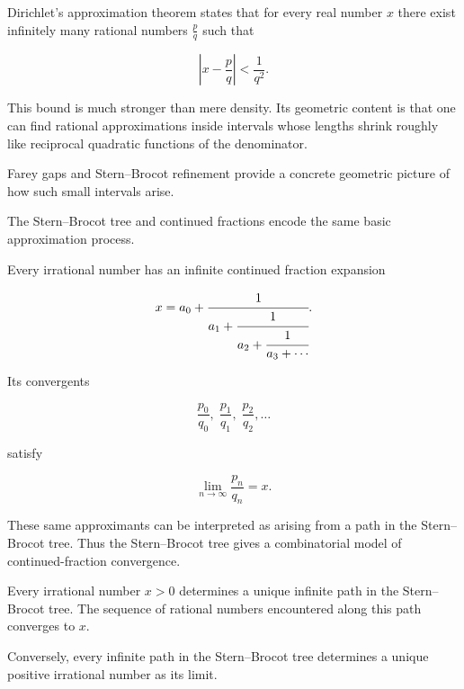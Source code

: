 
\begin{remark}
Dirichlet's approximation theorem states that for every real number $x$
there exist infinitely many rational numbers $\frac{p}{q}$ such that

\[
\left|x-\frac{p}{q}\right| < \frac{1}{q^2}.
\]

This bound is much stronger than mere density.  Its geometric content is
that one can find rational approximations inside intervals whose lengths
shrink roughly like reciprocal quadratic functions of the denominator.

Farey gaps and Stern--Brocot refinement provide a concrete geometric
picture of how such small intervals arise.
\end{remark}


\begin{remark}
The Stern--Brocot tree and continued fractions encode the same basic
approximation process.

Every irrational number has an infinite continued fraction expansion

\[
x
=
a_0 +
\cfrac{1}{a_1 +
\cfrac{1}{a_2 +
\cfrac{1}{a_3 + \cdots}}}.
\]

Its convergents

\[
\frac{p_0}{q_0},\;
\frac{p_1}{q_1},\;
\frac{p_2}{q_2},\dots
\]

satisfy

\[
\lim_{n\to\infty}\frac{p_n}{q_n}=x.
\]

These same approximants can be interpreted as arising from a path in
the Stern--Brocot tree.  Thus the Stern--Brocot tree gives a
combinatorial model of continued-fraction convergence.
\end{remark}


\begin{theorem}
\label{thm:stern-brocot-limit}

Every irrational number $x>0$ determines a unique infinite path in the
Stern--Brocot tree.  The sequence of rational numbers encountered along
this path converges to $x$.

Conversely, every infinite path in the Stern--Brocot tree determines a
unique positive irrational number as its limit.

\end{theorem}

